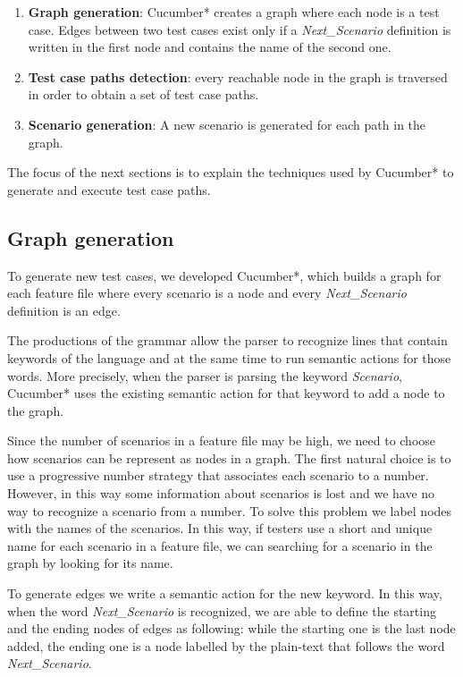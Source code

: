 \begin{enumerate}
\item \textbf{Graph generation}: Cucumber* creates a graph where each node is a test case. Edges between two test cases exist only if a \textit{Next\_Scenario} definition is written in the first node and contains the name of the second one.
\item \textbf{Test case paths detection}: every reachable node in the graph is traversed in order to obtain a set of test case paths.
\item \textbf{Scenario generation}: A new scenario is generated for each path in the graph.
\end{enumerate}

\noindent The focus of the next sections is to explain the techniques used by Cucumber* to generate and execute test case paths.

\newpage
\subsection{Graph generation}

To generate new test cases, we developed Cucumber*, which builds a graph for each feature file where every scenario is a node and every \textit{Next\_Scenario} definition is an edge.

The productions of the grammar allow the parser to recognize lines that contain keywords of the language and at the same time to run semantic actions for those words. More precisely, when the parser is parsing the keyword \textit{Scenario}, Cucumber* uses the existing semantic action for that keyword to add a node to the graph. 

Since the number of scenarios in a feature file may be high, we need to choose how scenarios can be represent as nodes in a graph. The first natural choice is to use a progressive number strategy that associates each scenario to a number. However, in this way some information about scenarios is lost and we have no way to recognize a scenario from a number. To solve this problem we label nodes with the names of the scenarios. In this way, if testers use a short and unique name for each scenario in a feature file, we can searching for a scenario in the graph by looking for its name.

To generate edges we write a semantic action for the new keyword. In this way, when the word \textit{Next\_Scenario} is recognized, we are able to define the starting and the ending nodes of edges as following: while the starting one is the last node added, the ending one is a node labelled by the plain-text that follows the word \textit{Next\_Scenario}.

